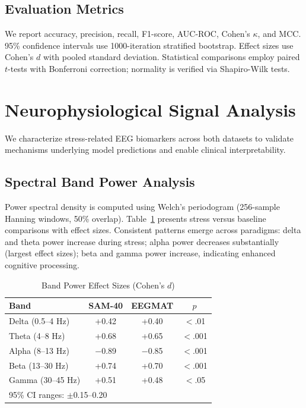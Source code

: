 \documentclass[journal,twoside]{IEEEtran}
\begin{document}
\subsection{Evaluation Metrics}

We report accuracy, precision, recall, F1-score, AUC-ROC, Cohen's $\kappa$, and MCC. 95\% confidence intervals use 1000-iteration stratified bootstrap. Effect sizes use Cohen's $d$ with pooled standard deviation. Statistical comparisons employ paired $t$-tests with Bonferroni correction; normality is verified via Shapiro-Wilk tests.

\section{Neurophysiological Signal Analysis}

We characterize stress-related EEG biomarkers across both datasets to validate mechanisms underlying model predictions and enable clinical interpretability.

\subsection{Spectral Band Power Analysis}

Power spectral density is computed using Welch's periodogram (256-sample Hanning windows, 50\% overlap). Table~\ref{tab:bandpower} presents stress versus baseline comparisons with effect sizes. Consistent patterns emerge across paradigms: delta and theta power increase during stress; alpha power decreases substantially (largest effect sizes); beta and gamma power increase, indicating enhanced cognitive processing.

\begin{table}[t]
\centering
\caption{Band Power Effect Sizes (Cohen's $d$)}
\label{tab:bandpower}
\scriptsize
\begin{tabular}{lccc}
\toprule
\textbf{Band} & \textbf{SAM-40} & \textbf{EEGMAT} & \textbf{$p$} \\
\midrule
Delta (0.5--4 Hz) & +0.42 & +0.40 & $<$.01 \\
Theta (4--8 Hz) & +0.68 & +0.65 & $<$.001 \\
Alpha (8--13 Hz) & $-$0.89 & $-$0.85 & $<$.001 \\
Beta (13--30 Hz) & +0.74 & +0.70 & $<$.001 \\
Gamma (30--45 Hz) & +0.51 & +0.48 & $<$.05 \\
\bottomrule
\multicolumn{4}{l}{\scriptsize 95\% CI ranges: $\pm$0.15--0.20}
\end{tabular}
\end{table}
\end{document}
